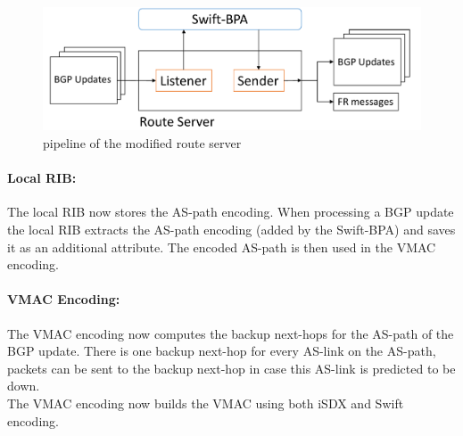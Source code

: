 \begin{figure}[h]
\center
\includegraphics[scale = 0.45]{Figures/design_route_server_cropped2.pdf}
\caption{pipeline of the modified route server}
\end{figure}


\paragraph{\label{chapter4:Changes to the iSDX:local RIB}Local RIB:}

The local RIB now stores the AS-path encoding. When processing a BGP update the local RIB extracts the AS-path encoding (added by the Swift-BPA) and saves it as an additional attribute. The encoded AS-path is then used in the VMAC encoding. 

\paragraph{\label{chapter4:Changes to the iSDX:Vmac Encoding}VMAC Encoding:}
The VMAC encoding now computes the backup next-hops for the AS-path of the BGP update. There is one backup next-hop for every AS-link on the AS-path, packets can be sent to the backup next-hop in case this AS-link is predicted to be down. \\
The VMAC encoding now builds the VMAC using both iSDX and Swift encoding. \\

\newpage
